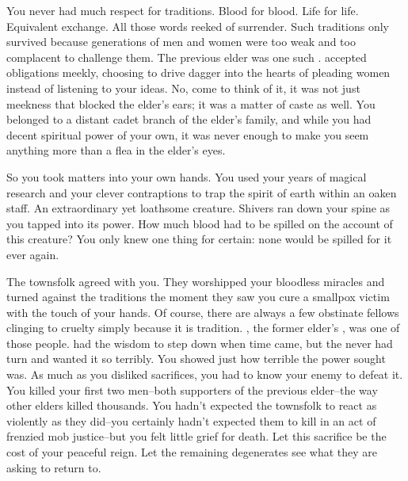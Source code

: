 \documentclass[char]{guildcamp4}
\begin{document}
\name{\cElder{}}

You never had much respect for traditions. Blood for blood. Life for life. Equivalent exchange. All those words reeked of surrender. Such traditions only survived because generations of men and women were too weak and too complacent to challenge them. The previous elder was one such \cShaman{\human}. \cShaman{\They} accepted \cShaman{\their} obligations meekly, choosing to drive \cShaman{\their} dagger into the hearts of pleading women instead of listening to your ideas. No, come to think of it, it was not just meekness that blocked the elder's ears; it was a matter of caste as well. You belonged to a distant cadet branch of the elder's family, and while you had decent spiritual power of your own, it was never enough to make you seem anything more than a flea in the elder's eyes. 

So you took matters into your own hands. You used your years of magical research and your clever contraptions to trap the spirit of earth within an oaken staff. An extraordinary yet loathsome creature. Shivers ran down your spine as you tapped into its power. How much blood had to be spilled on the account of this creature? You only knew one thing for certain: none would be spilled for it ever again.

The townsfolk agreed with you. They worshipped your bloodless miracles and turned against the traditions the moment they saw you cure a smallpox victim with the touch of your hands. Of course, there are always a few obstinate fellows clinging to cruelty simply because it is tradition. \cPlaguebearer{}, the former elder's \cPlaguebearer{\offspring}, was one of those people. \cPlaguebearer{\Their} \cShaman{\parent} had the wisdom to step down when time came, but the \cPlaguebearer{\kid} never had \cPlaguebearer{\their} turn and \cPlaguebearer{\they} wanted it so terribly. You showed \cPlaguebearer{\them} just how terrible the power \cPlaguebearer{\they} sought was. As much as you disliked sacrifices, you had to know your enemy to defeat it. You killed your first two men--both supporters of the previous elder--the way other elders killed thousands. You hadn't expected the townsfolk to react as violently as they did--you certainly hadn't expected them to kill \cPlaguebearer{} in an act of frenzied mob justice--but you felt little grief for \cPlaguebearer{\their} death. Let this sacrifice be the cost of your peaceful reign. Let the remaining degenerates see what they are asking to return to.
\end{document}
